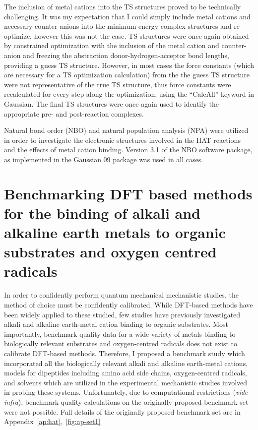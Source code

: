 The inclusion of metal cations into the TS structures proved to be technically challenging. It was my expectation that I could simply include metal cations and necessary counter-anions into the minimum energy complex structures and re-optimize, however this was not the case. TS structures were once again obtained by constrained optimization with the inclusion of the metal cation and counter-anion and freezing the abstraction donor-hydrogen-acceptor bond lengths, providing a guess TS structure. However, in most cases the force constants (which are necessary for a TS optimization calculation) from the the guess TS structure were not representative of the true TS structure, thus force constants were recalculated for every step along the optimization, using the ``CalcAll'' keyword in Gaussian. The final TS structures were once again used to identify the appropriate pre- and post-reaction complexes.

Natural bond order (NBO) and natural population analysis (NPA) were utilized in order to investigate the electronic structures involved in the HAT reactions and the effects of metal cation binding.\cite{Reed1983, Reed1985, Glendening2012} Version 3.1 of the NBO software package,\cite{NBO3} as implemented in the Gaussian 09 package was used in all cases.\cite{Frisch2009}

\section{Benchmarking DFT based methods for the binding of alkali and alkaline earth metals to organic substrates and oxygen centred radicals}
\label{sec:benchmark}

In order to confidently perform quantum mechanical mechanistic studies, the method of choice must be confidently calibrated. While DFT-based methods have been widely applied to these studied, few studies have previously investigated alkali and alkaline earth-metal cation binding to organic substrates.\cite{Corral2003, Suarez2011, Siu2001, Baldauf2013} Most importantly, benchmark quality data for a wide variety of metals binding to biologically relevant substrates and oxygen-centred radicals does not exist to calibrate DFT-based methods. Therefore, I proposed a benchmark study which incorporated all the biologically relevant alkali and alkaline earth-metal cations, models for dipeptides including amino acid side chains, oxygen-centred radicals, and solvents which are utilized in the experimental mechanistic studies involved in probing these systems. Unfortunately, due to computational restrictions (\emph{vide infra}), benchmark quality calculations on the originally proposed benchmark set were not possible. Full details of the originally proposed benchmark set are in Appendix~\ref{ap:hat},~\ref{fig:ap-set1}

